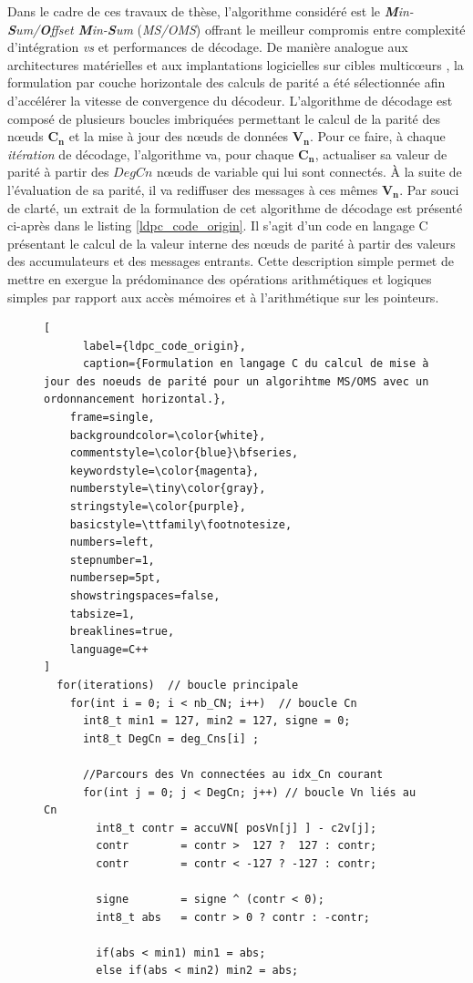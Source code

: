 \documentclass[../main.tex]{subfiles}
\begin{document}
Dans le cadre de ces travaux de thèse, l'algorithme considéré est le \textit{\textbf{M}in-\textbf{S}um/\textbf{O}ffset \textbf{M}in-\textbf{S}um} (\textit{MS/OMS}) offrant le meilleur compromis entre complexité d'intégration \textit{vs} et performances de décodage. De manière analogue aux architectures matérielles \cite{LDPC:APPROX:3,LDPC:APPROX:4} et aux implantations logicielles sur cibles multicœurs \cite{BLG:REVUE:TPDS}, la formulation par couche horizontale des calculs de parité a été sélectionnée afin d'accélérer la vitesse de convergence du décodeur. 
L'algorithme de décodage est composé de plusieurs boucles imbriquées permettant le calcul de la parité des nœuds $\bm{C_n}$ et la mise à jour des nœuds de données $\bm{V_n}$. 
Pour ce faire, à chaque \textit{itération} de décodage, l'algorithme va, pour chaque $\bm{C_n}$, actualiser sa valeur de parité à partir des $DegCn$ nœuds de variable qui lui sont connectés. 
À la suite de l'évaluation de sa parité, il va rediffuser des messages à ces mêmes $\bm{V_n}$. Par souci de clarté, un extrait de la formulation de cet algorithme de décodage est présenté ci-après dans le listing \ref{ldpc_code_origin}. Il s'agit d'un code en langage C présentant le calcul de la valeur interne des nœuds de parité à partir des valeurs des accumulateurs et des messages entrants. Cette description simple permet de mettre en exergue la prédominance des opérations arithmétiques et logiques simples par rapport aux accès mémoires et à l'arithmétique sur les pointeurs.



\begin{figure}[!tb]
\begin{lstlisting}[
      label={ldpc_code_origin},
      caption={Formulation en langage C du calcul de mise à jour des noeuds de parité pour un algorihtme MS/OMS avec un ordonnancement horizontal.},
    frame=single,
    backgroundcolor=\color{white},  
    commentstyle=\color{blue}\bfseries,
    keywordstyle=\color{magenta},
    numberstyle=\tiny\color{gray},
    stringstyle=\color{purple},
    basicstyle=\ttfamily\footnotesize,
    numbers=left,
    stepnumber=1,
    numbersep=5pt,                 
    showstringspaces=false,
    tabsize=1,
    breaklines=true,
    language=C++
]
  for(iterations)  // boucle principale
    for(int i = 0; i < nb_CN; i++)  // boucle Cn
      int8_t min1 = 127, min2 = 127, signe = 0;
      int8_t DegCn = deg_Cns[i] ;
      
      //Parcours des Vn connectées au idx_Cn courant 
      for(int j = 0; j < DegCn; j++) // boucle Vn liés au Cn 
        int8_t contr = accuVN[ posVn[j] ] - c2v[j]; 
        contr        = contr >  127 ?  127 : contr;
        contr        = contr < -127 ? -127 : contr;
        
        signe        = signe ^ (contr < 0);
        int8_t abs   = contr > 0 ? contr : -contr;
      
        if(abs < min1) min1 = abs;
        else if(abs < min2) min2 = abs;
\end{lstlisting}
\end{figure}
\end{document}
